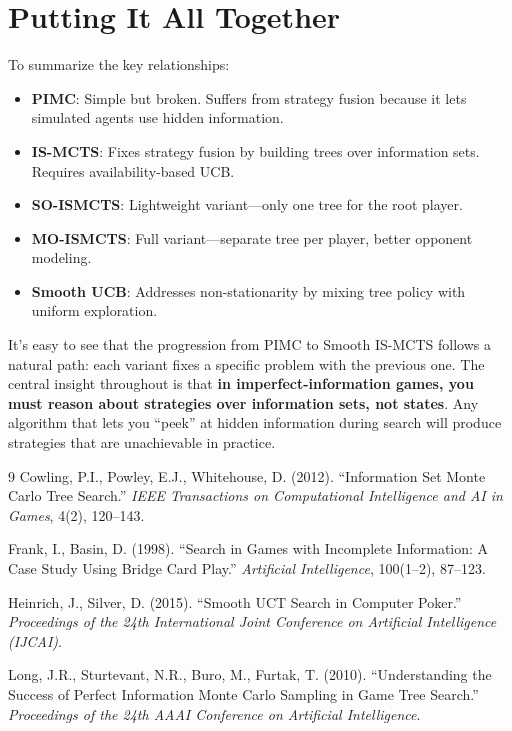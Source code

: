 \documentclass[11pt]{article}
\begin{document}
\section{Putting It All Together}

To summarize the key relationships:

\begin{itemize}
\item \textbf{PIMC}: Simple but broken. Suffers from strategy fusion because it lets simulated agents use hidden information.
\item \textbf{IS-MCTS}: Fixes strategy fusion by building trees over information sets. Requires availability-based UCB.
\item \textbf{SO-ISMCTS}: Lightweight variant---only one tree for the root player.
\item \textbf{MO-ISMCTS}: Full variant---separate tree per player, better opponent modeling.
\item \textbf{Smooth UCB}: Addresses non-stationarity by mixing tree policy with uniform exploration.
\end{itemize}

It's easy to see that the progression from PIMC to Smooth IS-MCTS follows a natural path: each variant fixes a specific problem with the previous one. The central insight throughout is that \textbf{in imperfect-information games, you must reason about strategies over information sets, not states}. Any algorithm that lets you ``peek'' at hidden information during search will produce strategies that are unachievable in practice.

\begin{thebibliography}{9}
 Cowling, P.I., Powley, E.J., Whitehouse, D. (2012). ``Information Set Monte Carlo Tree Search.'' \textit{IEEE Transactions on Computational Intelligence and AI in Games}, 4(2), 120--143.

 Frank, I., Basin, D. (1998). ``Search in Games with Incomplete Information: A Case Study Using Bridge Card Play.'' \textit{Artificial Intelligence}, 100(1--2), 87--123.

 Heinrich, J., Silver, D. (2015). ``Smooth UCT Search in Computer Poker.'' \textit{Proceedings of the 24th International Joint Conference on Artificial Intelligence (IJCAI)}.

 Long, J.R., Sturtevant, N.R., Buro, M., Furtak, T. (2010). ``Understanding the Success of Perfect Information Monte Carlo Sampling in Game Tree Search.'' \textit{Proceedings of the 24th AAAI Conference on Artificial Intelligence}.
\end{thebibliography}
\end{document}
